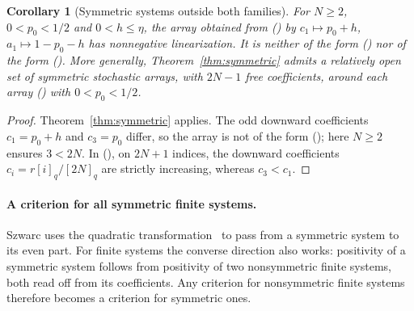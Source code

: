\documentclass[twoside,10pt]{article}
\numberwithin{equation}{section}
\theoremstyle{slbody}
\newtheorem{corollary}[theorem]{Corollary}
\theoremstyle{definition}
\theoremstyle{remark}
\renewcommand{\eqref}[1]{\textup{{\normalfont(\oldstylenums{\ref{#1}}}\normalfont)}}
\begin{document}
\begin{corollary}[Symmetric systems outside both families]\label{cor:symmetric-new}
For $N\geq2$, $0<p_0<1/2$ and $0<h\leq\eta$, the array obtained from \eqref{eq:qarray} by $c_1\mapsto p_0+h$, $a_1\mapsto1-p_0-h$ has nonnegative linearization. It is neither of the form \eqref{eq:qarray} nor of the form \eqref{eq:parameters}. More generally, Theorem~\ref{thm:symmetric} admits a relatively open set of symmetric stochastic arrays, with $2N-1$ free coefficients, around each array \eqref{eq:qarray} with $0<p_0<1/2$.
\end{corollary}
\begin{proof}
Theorem~\ref{thm:symmetric} applies. The odd downward coefficients $c_1=p_0+h$ and $c_3=p_0$ differ, so the array is not of the form \eqref{eq:qarray}; here $N\geq2$ ensures $3<2N$. In \eqref{eq:parameters}, on $2N+1$ indices, the downward coefficients $c_i=r[i]_q/[2N]_q$ are strictly increasing, whereas $c_3<c_1$.
\end{proof}

\paragraph{A criterion for all symmetric finite systems.}
Szwarc uses the quadratic transformation~\cite[\S3.5]{szwarc} to pass from a symmetric system to its even part. For finite systems the converse direction also works: positivity of a symmetric system follows from positivity of two nonsymmetric finite systems, both read off from its coefficients. Any criterion for nonsymmetric finite systems therefore becomes a criterion for symmetric ones.
\end{document}
